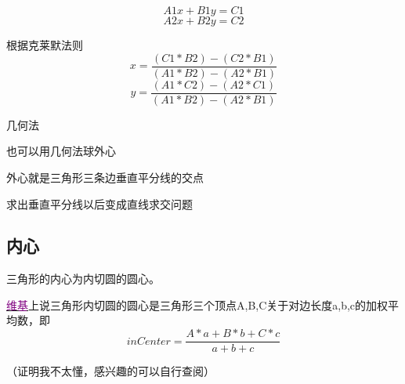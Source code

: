 \begin{frame}
\pause
\begin{equation}
    A1x+B1y=C1
\end{equation}
\begin{equation}
    A2x+B2y=C2
\end{equation}

\pause
根据克莱默法则
\begin{equation}
    x=\frac{ (C1*B2)-(C2*B1) }{ (A1*B2)-(A2*B1) }
\end{equation}
\begin{equation}
    y=\frac{ (A1*C2)-(A2*C1) }{ (A1*B2)-(A2*B1) }
\end{equation}
\end{frame}

\begin{frame}{几何法}

    也可以用几何法球外心

    外心就是三角形三条边垂直平分线的交点

    求出垂直平分线以后变成直线求交问题
\end{frame}

\subsection{内心}
\begin{frame}

三角形的内心为内切圆的圆心。\newline \newline

\href{https://en.wikipedia.org/wiki/Incenter}{\textcolor{purple}{维基}}上说三角形内切圆的圆心是三角形三个顶点A,B,C关于对边长度a,b,c的加权平均数，即
\begin{displaymath}
    inCenter=\frac{A*a+B*b+C*c}{a+b+c}
\end{displaymath}

（证明我不太懂，感兴趣的可以自行查阅）
\end{frame}
